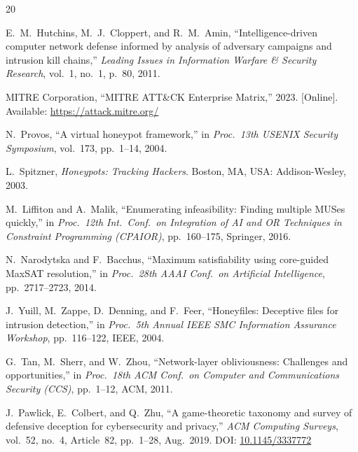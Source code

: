 \documentclass[journal]{IEEEtran}
\begin{document}
\begin{thebibliography}{20}


E.~M.~Hutchins, M.~J.~Cloppert, and R.~M.~Amin,
``Intelligence-driven computer network defense informed by
analysis of adversary campaigns and intrusion kill chains,''
\textit{Leading Issues in Information Warfare \& Security
Research}, vol.~1, no.~1, p.~80, 2011.

MITRE Corporation,
``MITRE ATT\&CK Enterprise Matrix,'' 2023.
[Online]. Available: \url{https://attack.mitre.org/}

N.~Provos,
``A virtual honeypot framework,''
in \textit{Proc.\ 13th USENIX Security Symposium},
vol.~173, pp.~1--14, 2004.

L.~Spitzner,
\textit{Honeypots: Tracking Hackers}.
Boston, MA, USA: Addison-Wesley, 2003.

M.~Liffiton and A.~Malik,
``Enumerating infeasibility: Finding multiple MUSes quickly,''
in \textit{Proc.\ 12th Int.\ Conf.\ on Integration of AI and
OR Techniques in Constraint Programming (CPAIOR)},
pp.~160--175, Springer, 2016.

N.~Narodytska and F.~Bacchus,
``Maximum satisfiability using core-guided MaxSAT
resolution,''
in \textit{Proc.\ 28th AAAI Conf.\ on Artificial
Intelligence}, pp.~2717--2723, 2014.


J.~Yuill, M.~Zappe, D.~Denning, and F.~Feer,
``Honeyfiles: Deceptive files for intrusion detection,''
in \textit{Proc.\ 5th Annual IEEE SMC Information Assurance
Workshop}, pp.~116--122, IEEE, 2004.

G.~Tan, M.~Sherr, and W.~Zhou,
``Network-layer obliviousness: Challenges and opportunities,''
in \textit{Proc.\ 18th ACM Conf.\ on Computer and
Communications Security (CCS)}, pp.~1--12, ACM, 2011.

J.~Pawlick, E.~Colbert, and Q.~Zhu,
``A game-theoretic taxonomy and survey of defensive deception
for cybersecurity and privacy,''
\textit{ACM Computing Surveys}, vol.~52, no.~4, Article~82,
pp.~1--28, Aug.~2019.
DOI: \href{https://doi.org/10.1145/3337772}{10.1145/3337772}


\end{thebibliography}
\end{document}
